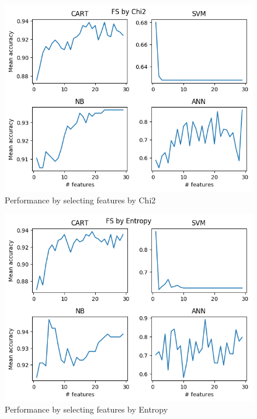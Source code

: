 \documentclass{kththesis}
\begin{document}
\begin{figure}[ht!]
  \includegraphics[width=\linewidth]{../plots/FS_by_Chi2.png}
  \caption{Performance by selecting features by Chi2}
  \label{fig:chi2}
\end{figure}

\begin{figure}[ht!]
  \includegraphics[width=\linewidth]{../plots/FS_by_Entropy.png}
  \caption{Performance by selecting features by Entropy}
  \label{fig:entropy}
\end{figure}
\end{document}
